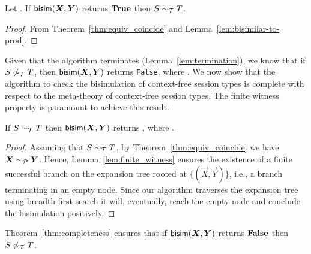 \begin{theorem}[Soundness]
  \label{thm:soundness}
  Let \grmcontext.  If $\Bisim(\vec X,\vec Y)$ returns $\mathbf{True}$ then
  $S\sim_\mathcal T T$.
\end{theorem}
%
\begin{proof}
  From Theorem~\ref{thm:equiv_coincide} and
  Lemma~\ref{lem:bisimilar-to-prod}.
\end{proof}

 
Given that the algorithm terminates (Lemma~\ref{lem:termination}), we
know that if $S\not\sim_\mathcal T T$, then $\Bisim(\vec X, \vec Y)$ returns
\lstinline|False|, where \grmcontext.
%
We now show that the algorithm to check the bisimulation of
context-free session types is complete with respect to the meta-theory
of context-free session types. The finite witness property is
paramount to achieve this result.

\begin{theorem}[Completeness]
\label{thm:completeness}
  If $S \sim_\mathcal T T$ then $\Bisim(\vec X, \vec Y)$ returns
  , where \grmcontext.
\end{theorem}
%
\begin{proof}
  Assuming that $S \sim_\mathcal T T$, by Theorem~\ref{thm:equiv_coincide}
  we have $\vec X \ProdEquiv \vec Y$.  Hence,
  Lemma~\ref{lem:finite_witness} ensures the existence of a finite
  successful branch on the expansion tree rooted at
  $\{(\vec X,\vec Y)\}$, i.e., a branch terminating in an empty
  node.  Since our algorithm traverses the expansion tree using
  breadth-first search it will, eventually, reach the empty node and
  conclude the bisimulation positively.
\end{proof}

Theorem~\ref{thm:completeness} ensures that if $\Bisim(\vec X,\vec Y)$
returns $\mathbf{False}$ then $S \not\sim_\mathcal T T$. 


